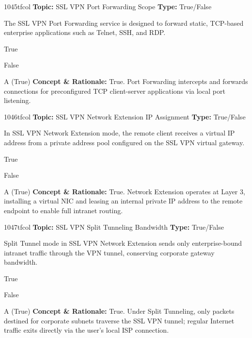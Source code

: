 \begin{qcard}{1045}{tfcol}
\textcolor{darkslate!75}{\small\textbf{Topic:} SSL VPN Port Forwarding Scope \hfill \textbf{Type:} True/False}\vspace{0.4em}\par
The SSL VPN Port Forwarding service is designed to forward static, TCP-based enterprise applications such as Telnet, SSH, and RDP.
\begin{qoptions}
\item True
\item False
\end{qoptions}
\end{qcard}
\nopagebreak
\begin{explainbox}{A (True)}
\textbf{Concept \& Rationale:} True. Port Forwarding intercepts and forwards connections for preconfigured TCP client-server applications via local port listening.
\end{explainbox}

\begin{qcard}{1046}{tfcol}
\textcolor{darkslate!75}{\small\textbf{Topic:} SSL VPN Network Extension IP Assignment \hfill \textbf{Type:} True/False}\vspace{0.4em}\par
In SSL VPN Network Extension mode, the remote client receives a virtual IP address from a private address pool configured on the SSL VPN virtual gateway.
\begin{qoptions}
\item True
\item False
\end{qoptions}
\end{qcard}
\nopagebreak
\begin{explainbox}{A (True)}
\textbf{Concept \& Rationale:} True. Network Extension operates at Layer 3, installing a virtual NIC and leasing an internal private IP address to the remote endpoint to enable full intranet routing.
\end{explainbox}

\begin{qcard}{1047}{tfcol}
\textcolor{darkslate!75}{\small\textbf{Topic:} SSL VPN Split Tunneling Bandwidth \hfill \textbf{Type:} True/False}\vspace{0.4em}\par
Split Tunnel mode in SSL VPN Network Extension sends only enterprise-bound intranet traffic through the VPN tunnel, conserving corporate gateway bandwidth.
\begin{qoptions}
\item True
\item False
\end{qoptions}
\end{qcard}
\nopagebreak
\begin{explainbox}{A (True)}
\textbf{Concept \& Rationale:} True. Under Split Tunneling, only packets destined for corporate subnets traverse the SSL VPN tunnel; regular Internet traffic exits directly via the user's local ISP connection.
\end{explainbox}

